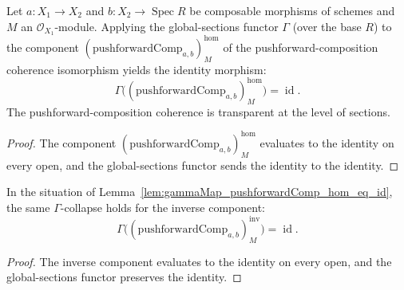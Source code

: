 
\begin{lemma}

  \label{lem:gammaMap_pushforwardComp_hom_eq_id}
  Let \(a : X_1 \to X_2\) and \(b : X_2 \to \operatorname{Spec} R\) be composable morphisms of
  schemes and \(M\) an \(\mathcal{O}_{X_1}\)-module. Applying the global-sections functor
  \(\Gamma\) (over the base \(R\)) to the component
  \((\mathrm{pushforwardComp}_{a,b})^{\mathrm{hom}}_M\) of the pushforward-composition coherence
  isomorphism yields the identity morphism:
  \[
    \Gamma\bigl((\mathrm{pushforwardComp}_{a,b})^{\mathrm{hom}}_M\bigr) = \operatorname{id}.
  \]
  The pushforward-composition coherence is transparent at the level of sections.
\end{lemma}
\begin{proof}
  The component \((\mathrm{pushforwardComp}_{a,b})^{\mathrm{hom}}_M\) evaluates to the identity
  on every open, and the global-sections functor sends the identity to the identity.
\end{proof}

\begin{lemma}

  \label{lem:gammaMap_pushforwardComp_inv_eq_id}
  In the situation of Lemma~\ref{lem:gammaMap_pushforwardComp_hom_eq_id}, the same
  \(\Gamma\)-collapse holds for the inverse component:
  \[
    \Gamma\bigl((\mathrm{pushforwardComp}_{a,b})^{\mathrm{inv}}_M\bigr) = \operatorname{id}.
  \]
\end{lemma}
\begin{proof}
  The inverse component evaluates to the identity on every open, and the global-sections
  functor preserves the identity.
\end{proof}

